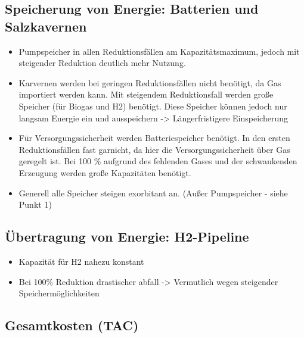 \subsection{Speicherung von Energie: Batterien und Salzkavernen}
\begin{itemize}
  \item Pumpspeicher in allen Reduktionsfällen am Kapazitätsmaximum, jedoch mit steigender Reduktion deutlich mehr Nutzung. 
  \item Karvernen werden bei geringen Reduktionsfällen nicht benötigt, da Gas importiert werden kann. Mit steigendem Reduktionsfall werden große Speicher (für Biogas und H2) benötigt. Diese Speicher können jedoch nur langsam Energie ein und ausspeichern -> Längerfristigere Einspeicherung
  \item Für Versorgungssicherheit werden Batteriespeicher benötigt. In den ersten Reduktionsfällen fast garnicht, da hier die Versorgungssicherheit über Gas geregelt ist. Bei 100 \% aufgrund des fehlenden Gases und der schwankenden Erzeugung werden große Kapazitäten benötigt.
  \item Generell alle Speicher steigen exorbitant an. (Außer Pumpspeicher - siehe Punkt 1)
\end{itemize}



\subsection{Übertragung von Energie: H2-Pipeline}
\begin{itemize}
  \item Kapazität für H2 nahezu konstant
  \item Bei 100\% Reduktion drastischer abfall -> Vermutlich wegen steigender Speichermöglichkeiten  
\end{itemize}

\subsection{Gesamtkosten (TAC)}





